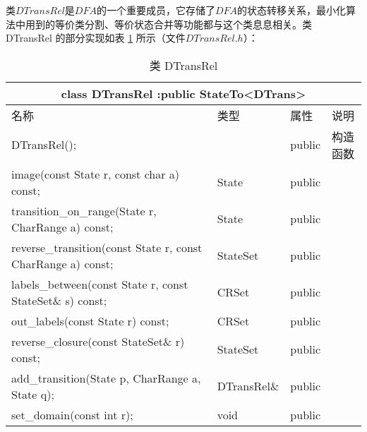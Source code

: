 类$DTransRel$是$DFA$的一个重要成员，它存储了$DFA$的状态转移关系，最小化算法中用到的等价类分割、等价状态合并等功能都与这个类息息相关。类 DTransRel 的部分实现如表 \ref{tab:Class-DTransRel} 所示（文件$DTransRel.h$）：

\begin{table}[!htbp]
    \caption{类 DTransRel}
    \label{tab:Class-DTransRel}
    \centering
    \small%
    \setlength{\tabcolsep}{4pt}%
    \renewcommand{\arraystretch}{1.2}%
        \begin{tabular}{llll} %
        \toprule 
         \multicolumn{4}{c}{class DTransRel :public StateTo<DTrans>} \\
        \midrule
        名称& 类型 & 属性  &\mbox{说明} \\
        \midrule 
        DTransRel(); &  &  public & 构造函数 \\
        image(const State r, const char a) const; & State & public & \\
        transition\_on\_range(State r, CharRange a) const; & State & public & \\
        reverse\_transition(const State r, const CharRange a) const; & StateSet & public & \\
        labels\_between(const State r, const StateSet\& s) const; & CRSet & public & \\
        out\_labels(const State r) const; & CRSet & public & \\
        reverse\_closure(const StateSet\& r) const; & StateSet & public & \\
        add\_transition(State p, CharRange a, State q); & DTransRel\& & public & \\
        set\_domain(const int r); & void & public & \\
        \bottomrule 
    \end{tabular}
\end{table}

